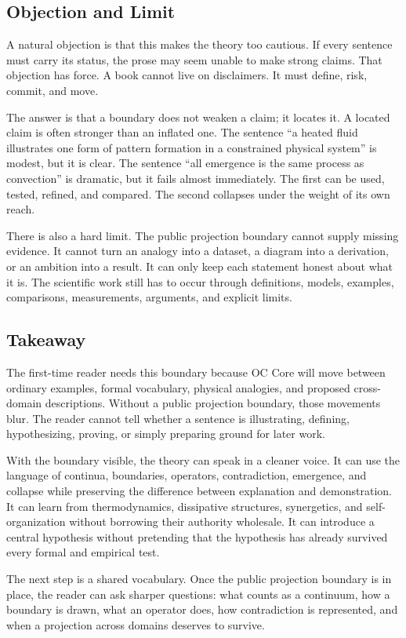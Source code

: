 \documentclass[11pt,a4paper,openany]{book}
\begin{document}
\subsection{Objection and Limit}
A natural objection is that this makes the theory too cautious. If every sentence must carry its status, the prose may seem unable to make strong claims. That objection has force. A book cannot live on disclaimers. It must define, risk, commit, and move. \cite{landau_stat_physics,prigogine_dissipative}\par
The answer is that a boundary does not weaken a claim; it locates it. A located claim is often stronger than an inflated one. The sentence ``a heated fluid illustrates one form of pattern formation in a constrained physical system'' is modest, but it is clear. The sentence ``all emergence is the same process as convection'' is dramatic, but it fails almost immediately. The first can be used, tested, refined, and compared. The second collapses under the weight of its own reach.\par
There is also a hard limit. The public projection boundary cannot supply missing evidence. It cannot turn an analogy into a dataset, a diagram into a derivation, or an ambition into a result. It can only keep each statement honest about what it is. The scientific work still has to occur through definitions, models, examples, comparisons, measurements, arguments, and explicit limits.\par
\subsection{Takeaway}
The first-time reader needs this boundary because OC Core will move between ordinary examples, formal vocabulary, physical analogies, and proposed cross-domain descriptions. Without a public projection boundary, those movements blur. The reader cannot tell whether a sentence is illustrating, defining, hypothesizing, proving, or simply preparing ground for later work. \cite{landau_stat_physics,prigogine_dissipative}\par
With the boundary visible, the theory can speak in a cleaner voice. It can use the language of continua, boundaries, operators, contradiction, emergence, and collapse while preserving the difference between explanation and demonstration. It can learn from thermodynamics, dissipative structures, synergetics, and self-organization without borrowing their authority wholesale. It can introduce a central hypothesis without pretending that the hypothesis has already survived every formal and empirical test.\par
The next step is a shared vocabulary. Once the public projection boundary is in place, the reader can ask sharper questions: what counts as a continuum, how a boundary is drawn, what an operator does, how contradiction is represented, and when a projection across domains deserves to survive.\par
\end{document}
